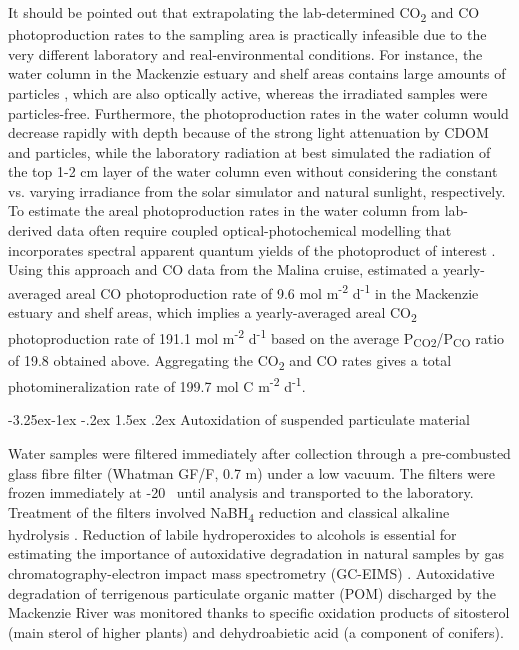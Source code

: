 \documentclass[essd, manuscript]{copernicus}
\makeatletter
\renewcommand\paragraph{\@startsection{paragraph}{4}{\z@}%
                                     {-3.25ex\@plus -1ex \@minus -.2ex}%
                                     {1.5ex \@plus .2ex}%
                                     {\normalfont\normalsize\bfseries}}
\makeatother
\begin{document}
It should be pointed out that extrapolating the lab-determined CO\textsubscript{2} and CO photoproduction rates to the sampling area is practically infeasible due to the very different laboratory and real-environmental conditions. For instance, the water column in the Mackenzie estuary and shelf areas contains large amounts of particles \citep{Doxaran2012}, which are also optically active, whereas the irradiated samples were particles-free. Furthermore, the photoproduction rates in the water column would decrease rapidly with depth because of the strong light attenuation by CDOM and particles, while the laboratory radiation at best simulated the radiation of the top 1-2 cm layer of the water column even without considering the constant vs. varying irradiance from the solar simulator and natural sunlight, respectively. To estimate the areal photoproduction rates in the water column from lab-derived data often require coupled optical-photochemical modelling that incorporates spectral apparent quantum yields of the photoproduct of interest \citep{Belanger2006, Xie2009, Fichot2010}. Using this approach and CO data from the Malina cruise, \citet{Song2013} estimated a yearly-averaged areal CO photoproduction rate of 9.6 \textmu mol m\textsuperscript{-2} d\textsuperscript{-1} in the Mackenzie estuary and shelf areas, which implies a yearly-averaged areal CO\textsubscript{2} photoproduction rate of 191.1 \textmu mol m\textsuperscript{-2} d\textsuperscript{-1} based on the average P\textsubscript{CO2}/P\textsubscript{CO} ratio of 19.8 obtained above. Aggregating the CO\textsubscript{2} and CO rates gives a total photomineralization rate of 199.7 \textmu mol C m\textsuperscript{-2} d\textsuperscript{-1}. 

\paragraph{Autoxidation of suspended particulate material}

Water samples were filtered immediately after collection through a pre-combusted glass fibre filter (Whatman GF/F, 0.7 \textmu m) under a low vacuum. The filters were frozen immediately at -20 \textcelsius~until analysis and transported to the laboratory. Treatment of the filters involved NaBH\textsubscript{4} reduction and classical alkaline hydrolysis \citep{Rontani2012}. Reduction of labile hydroperoxides to alcohols is essential for estimating the importance of autoxidative degradation in natural samples by gas chromatography-electron impact mass spectrometry (GC-EIMS) \citep{Marchand2001}. Autoxidative degradation of terrigenous particulate organic matter (POM) discharged by the Mackenzie River was monitored thanks to specific oxidation products of sitosterol (main sterol of higher plants) and dehydroabietic acid (a component of conifers). 
\end{document}
